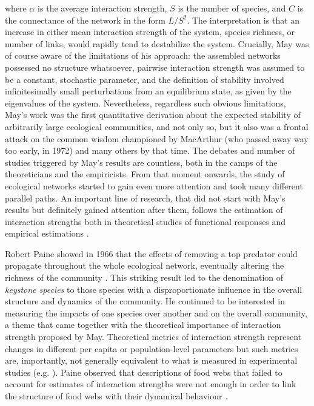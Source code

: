 where $\alpha$ is the average interaction strength, $S$ is the number of species, and $C$ is the connectance of the network in the form $L/S^2$. The interpretation is that an increase in either mean interaction strength of the system, species richness, or number of links, would rapidly tend to destabilize the system. Crucially, May was of course aware of the limitations of his approach: the assembled networks possessed no structure whatsoever, pairwise interaction strength was assumed to be a constant, stochastic parameter, and the definition of stability involved infinitesimally small perturbations from an equilibrium state, as given by the eigenvalues of the system. Nevertheless, regardless such obvious limitations, May's work was the first quantitative derivation about the expected stability of arbitrarily large ecological communities, and not only so, but it also was a frontal attack on the common wisdom championed by MacArthur (who passed away way too early, in 1972) and many others by that time. The debates and number of studies triggered by May's results are countless, both in the camps of the theoreticians and the empiricists. From that moment onwards, the study of ecological networks started to gain even more attention and took many different parallel paths. An important line of research, that did not start with May's results but definitely gained attention after them, follows the estimation of interaction strengths both in theoretical studies of functional responses \citep{Holling1965} and empirical estimations \citep{Bender1984}.

Robert Paine showed in 1966 that the effects of removing a top predator could propagate throughout the whole ecological network, eventually altering the richness of the community \citep{Paine1966}. This striking result led to the denomination of \textit{keystone species} to those species with a disproportionate influence in the overall structure and dynamics of the community. He continued to be interested in measuring the impacts of one species over another and on the overall community, a theme that came together with the theoretical importance of interaction strength proposed by May. Theoretical metrics of interaction strength represent changes in different per capita or population-level parameters \citep{Laska1998} but such metrics are, importantly, not generally equivalent to what is measured in experimental studies (e.g. \citealt{Bender1984}). Paine observed that descriptions of food webs that failed to account for estimates of interaction strengths were not enough in order to link the structure of food webs with their dynamical behaviour \citep{Paine1992}.


